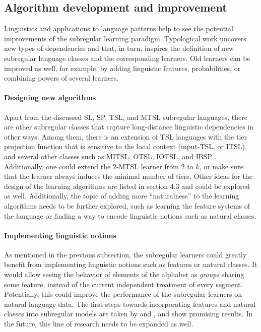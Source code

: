 \subsection{Algorithm development and improvement}

Linguistics and applications to language patterns help to see the potential improvements of the subregular learning paradigm.
Typological work uncovers new types of dependencies and that, in turn, inspires the definition of new subregular language classes and the corresponding learners.
Old learners can be improved as well, for example, by adding linguistic features, probabilities, or combining powers of several learners.


\paragraph{Designing new algorithms}
Apart from the discussed SL, SP, TSL, and MTSL subregular languages, there are other subregular classes that capture long-distance linguistic dependencies in other ways.
Among them, there is an extension of TSL languages with the tier projection function that is sensitive to the local context (input-TSL, or ITSL), and several other classes such as MITSL, OTSL, IOTSL, and IBSP \citep{Graf17Phonology,DeSantoGraf19FG}.
Additionally, one could extend the $2$-MTSL learner from $2$ to $k$, or make sure that the learner always induces the minimal number of tiers.
Other ideas for the design of the learning algorithms are listed in section 4.3 and could be explored as well.
Additionally, the topic of adding more ``naturalness'' to the learning algorithms needs to be further explored, such as learning the feature systems of the language or finding a way to encode linguistic notions such as natural classes.


\paragraph{Implementing linguistic notions}
As mentioned in the previous subsection, the subregular learners could greatly benefit from implementing linguistic notions such as features or natural classes.
It would allow seeing the behavior of elements of the alphabet as \emph{groups} sharing some feature, instead of the current independent treatment of every segment.
Potentially, this could improve the performance of the subregular learners on natural language data.
The first steps towards incorporating features and natural classes into subregular models are taken by \cite{Strother-Garcia-HeinzEtAl-2016-UMTGICSP} and \cite{chandlee-etal-2019-learning}, and show promising results.
In the future, this line of research needs to be expanded as well.
 


